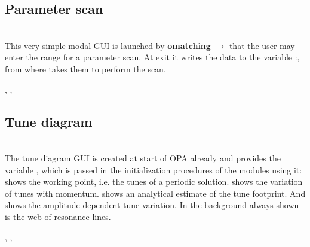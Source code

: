 \documentclass[12pt]{article}
\newcommand\code[1]{{\tt #1}}
\newcommand{\ofld}[1]{\colorbox{black!15}{{{\color{black}\bf #1}}}}
\newcommand\guico[1]{{\color{blue}\code{#1}}}
\newcommand{\unico}[1]{{\color{burntorange}\code{#1}}}
\newcommand{\evcod}[2]{\ofld{#1} $\rightarrow$ \guico{#2}}
\newcommand{\vrcod}[2]{\opauni{#1}:\unico{#2}}
\newcommand{\opagui}[1]{\colorbox{blue!20}{{\color{black}\code{#1}}}}
\newcommand{\oguih}[2]{\subsection{\label{#2}#1}{\Huge\opagui{#2}}\\}
\newcommand{\ogui}[1]{\hyperref[#1]{\opagui{#1}}}
\newcommand{\opaguif}[1]{\colorbox{violet!30}{{\color{black}\code{#1}}}}
\newcommand{\oguif}[1]{\hyperref[#1]{\opaguif{#1}}}
\newcommand{\opauni}[1]{\colorbox{orange!30}{{\color{black}\code{#1}}}}
\newcommand{\ouni}[1]{\hyperref[#1]{\opauni{#1}}}
\newcommand{\uses}[1]{\flushleft {\bf Uses:} #1}
\newcommand{\desc}[1]{#1}
\begin{document}
\oguih{Parameter scan}{omatchscan}

\desc{This very simple modal GUI is launched by \evcod{omatching}{ScanClick} that the user may enter the range for a parameter scan. At exit it writes the data to the variable \vrcod{linoplib}{ScanPar}, from where \ogui{omatching} takes them to perform the scan.}

\uses{\ouni{linoplib}, \ouni{globlib}, \ouni{comauxlib}} 


\oguih{Tune diagram}{opatunediag}

\desc{The tune diagram GUI is created at start of OPA already and provides the variable \guico{tuneplot}, which is passed in the initialization procedures of the modules using it: \ogui{opalinop} shows the working point, i.e. the tunes of a periodic solution. \ogui{opamomentum} shows the variation of tunes with momentum. \ogui{opachroma} shows an analytical estimate of the tune footprint. And \ogui{opatrackps} shows the amplitude dependent tune variation. In the background always shown is the web of resonance lines.}

\uses{\ouni{globlib}, \oguif{comfigureframe}, \ouni{comauxlib}}
\end{document}
